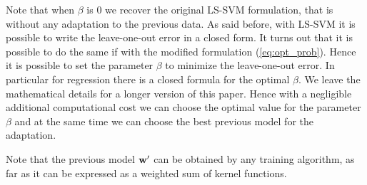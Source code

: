 Note that when $\beta$ is $0$ we recover the original LS-SVM formulation, that is without any
adaptation to the previous data.
As said before, with LS-SVM it is possible to write the leave-one-out error
in a closed form. It turns out that it is possible to do the same if with the
modified formulation (\ref{eq:opt_prob}). Hence it is possible to set the
parameter $\beta$ to minimize the leave-one-out error. In particular
for regression there is a closed formula for the optimal $\beta$. We leave the
mathematical details for a longer version of this paper.
Hence with a negligible additional computational cost we can choose the optimal
value for the parameter $\beta$ and at the same time we can choose the best
previous model for the adaptation.

Note that the previous model $\mathbf{w}'$ can be obtained by any training algorithm,
as far as it can be expressed as a weighted sum of kernel functions.